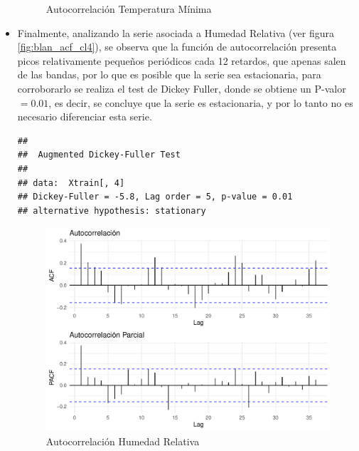 \documentclass[12pt,oneside]{book}\usepackage[]{graphicx}\usepackage[]{color}
\makeatletter
\def\maxwidth{ %
  \ifdim\Gin@nat@width>\linewidth
    \linewidth
  \else
    \Gin@nat@width
  \fi
}
\newenvironment{kframe}{%
 \def\at@end@of@kframe{}%
 \ifinner\ifhmode%
  \def\at@end@of@kframe{\end{minipage}}%
  \begin{minipage}{\columnwidth}%
 \fi\fi%
 \def\FrameCommand##1{\hskip\@totalleftmargin \hskip-\fboxsep
 \colorbox{shadecolor}{##1}\hskip-\fboxsep
     \hskip-\linewidth \hskip-\@totalleftmargin \hskip\columnwidth}%
 \MakeFramed {\advance\hsize-\width
   \@totalleftmargin\z@ \linewidth\hsize
   \@setminipage}}%
 {\par\unskip\endMakeFramed%
 \at@end@of@kframe}
\newenvironment{knitrout}{}{} %
\theoremstyle{definition} %
\makeatother
\begin{document}
\begin{itemize}
\begin{knitrout}
\begin{figure}[H]
{}

\caption{\label{fig:blan_acf_cl3} Autocorrelación Temperatura Mínima}\label{fig:unnamed-chunk-29}
\end{figure}


\end{knitrout}


\item Finalmente, analizando la serie asociada a Humedad Relativa (ver figura \ref{fig:blan_acf_cl4}), se observa que la función de autocorrelación presenta picos relativamente pequeños periódicos cada 12 retardos, que apenas salen de las bandas, por lo que es posible que la serie sea estacionaria, para corroborarlo se realiza el test de Dickey Fuller, donde se obtiene un P-valor$=0.01$, es decir, se concluye que la serie es estacionaria, y por lo tanto no es necesario diferenciar esta serie.

\begin{knitrout}
\color{fgcolor}\begin{kframe}
\begin{verbatim}
## 
## 	Augmented Dickey-Fuller Test
## 
## data:  Xtrain[, 4]
## Dickey-Fuller = -5.8, Lag order = 5, p-value = 0.01
## alternative hypothesis: stationary
\end{verbatim}
\end{kframe}
\end{knitrout}


\begin{knitrout}
\color{fgcolor}\begin{figure}[H]

{\centering \includegraphics[width=\maxwidth]{figure/unnamed-chunk-31-1} 

}

\caption{\label{fig:blan_acf_cl4} Autocorrelación Humedad Relativa}\label{fig:unnamed-chunk-31}
\end{figure}


\end{knitrout}



\end{itemize}
\end{document}
